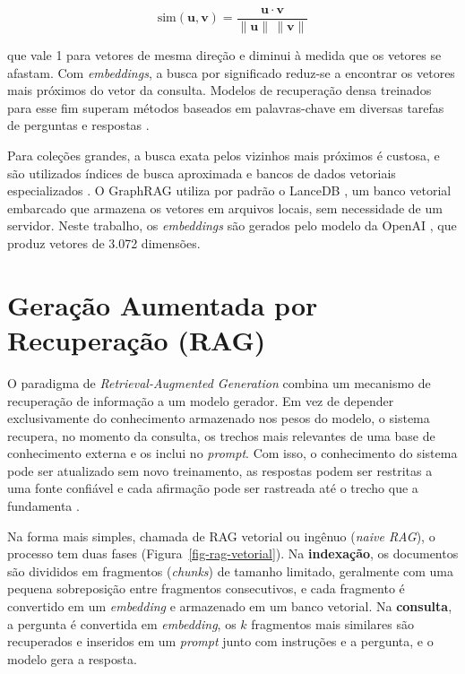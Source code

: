 \begin{equation}
\label{eq-cosseno}
\mathrm{sim}(\mathbf{u}, \mathbf{v}) = \frac{\mathbf{u} \cdot \mathbf{v}}{\lVert \mathbf{u} \rVert \, \lVert \mathbf{v} \rVert}
\end{equation}

\noindent que vale 1 para vetores de mesma direção e diminui à medida que os vetores se afastam. Com \textit{embeddings}, a busca por significado reduz-se a encontrar os vetores mais próximos do vetor da consulta. Modelos de recuperação densa treinados para esse fim superam métodos baseados em palavras-chave em diversas tarefas de perguntas e respostas \cite{karpukhin2020dense}.

Para coleções grandes, a busca exata pelos vizinhos mais próximos é custosa, e são utilizados índices de busca aproximada e bancos de dados vetoriais especializados \cite{johnson2019billion}. O GraphRAG utiliza por padrão o LanceDB \cite{lancedb}, um banco vetorial embarcado que armazena os vetores em arquivos locais, sem necessidade de um servidor. Neste trabalho, os \textit{embeddings} são gerados pelo modelo  da OpenAI \cite{openai2024embeddings}, que produz vetores de 3.072 dimensões.

\section{Geração Aumentada por Recuperação (RAG)}
\label{sec-referencial-rag}

O paradigma de \textit{Retrieval-Augmented Generation} \cite{lewis2020retrieval} combina um mecanismo de recuperação de informação a um modelo gerador. Em vez de depender exclusivamente do conhecimento armazenado nos pesos do modelo, o sistema recupera, no momento da consulta, os trechos mais relevantes de uma base de conhecimento externa e os inclui no \textit{prompt}. Com isso, o conhecimento do sistema pode ser atualizado sem novo treinamento, as respostas podem ser restritas a uma fonte confiável e cada afirmação pode ser rastreada até o trecho que a fundamenta \cite{gao2023retrieval}.

Na forma mais simples, chamada de RAG vetorial ou ingênuo (\textit{naive RAG}), o processo tem duas fases (Figura~\ref{fig-rag-vetorial}). Na \textbf{indexação}, os documentos são divididos em fragmentos (\textit{chunks}) de tamanho limitado, geralmente com uma pequena sobreposição entre fragmentos consecutivos, e cada fragmento é convertido em um \textit{embedding} e armazenado em um banco vetorial. Na \textbf{consulta}, a pergunta é convertida em \textit{embedding}, os $k$ fragmentos mais similares são recuperados e inseridos em um \textit{prompt} junto com instruções e a pergunta, e o modelo gera a resposta.

